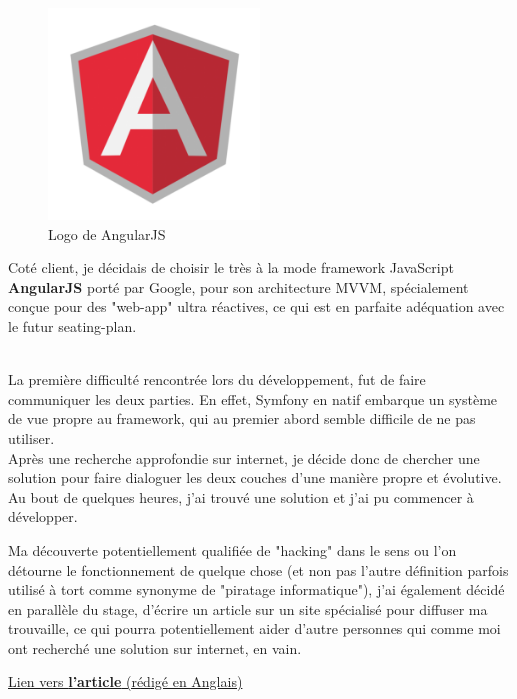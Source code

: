 \documentclass{report}
\newcommand{\jumpOne}{\\[1\baselineskip]}
\newcommand{\jumpTwo}{\\[2\baselineskip]}
\begin{document}
\begin{minipage}{0.5\textwidth}
	\begin{figure}[H]
		\centering
		\includegraphics[width=0.5\textwidth]{assets/angular.png}
		\caption{Logo de AngularJS}
	\end{figure}
\end{minipage} 
\hfill
\begin{minipage}{0.45\textwidth}
	Coté client, je décidais de choisir le très à la mode \gls{framework} JavaScript \textbf{AngularJS} porté par Google, pour son architecture \gls{MVVM}, spécialement conçue pour des "web-app" ultra réactives, ce qui est en parfaite adéquation avec le futur seating-plan.  
\end{minipage}
\jumpTwo
La première difficulté rencontrée lors du développement, fut de faire communiquer les deux parties. En effet, Symfony en natif embarque un système de vue propre au \gls{framework}, qui au premier abord semble difficile de ne pas utiliser.  
\jumpOne
Après une recherche approfondie sur internet, je décide donc de chercher une solution pour faire dialoguer les deux couches d'une manière propre et évolutive. 
\jumpOne
Au bout de quelques heures, j'ai trouvé une solution et j'ai pu commencer à développer.

Ma découverte potentiellement qualifiée de "hacking" dans le sens ou l'on détourne le fonctionnement de quelque chose (et non pas l'autre définition parfois utilisé à tort comme synonyme de "piratage informatique"), j'ai également décidé en parallèle du stage, d'écrire un article sur un site spécialisé pour diffuser ma trouvaille, ce qui pourra potentiellement aider d'autre personnes qui comme moi ont recherché une solution sur internet, en vain. 

\href{https://medium.com/@llaine/operate-with-harmony-symfony2-angularjs-283b641d3b05}{Lien vers \textbf{l'article} (rédigé en Anglais)}
\end{document}
